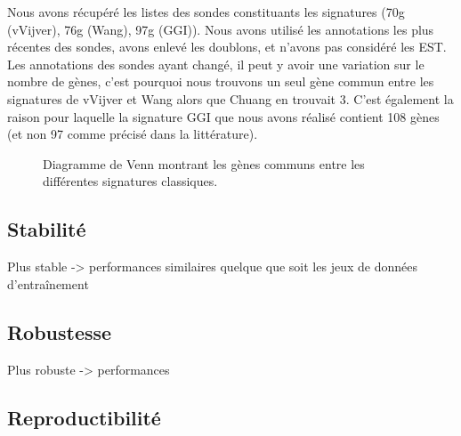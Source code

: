     Nous avons récupéré les listes des sondes constituants les signatures (70g (vVijver), 76g (Wang), 97g (GGI)). Nous avons utilisé les annotations les plus récentes des sondes, avons enlevé les doublons, et n'avons pas considéré les EST. Les annotations des sondes ayant changé, il peut y avoir une variation sur le nombre de gènes, c'est pourquoi nous trouvons un seul gène commun entre les signatures de vVijver et Wang alors que Chuang en trouvait 3. C'est également la raison pour laquelle la signature GGI que nous avons réalisé contient 108 gènes (et non 97 comme précisé dans la littérature).

    \begin{figure}
      \begin{center}
      \end{center}
      \caption{Diagramme de Venn montrant les gènes communs entre les différentes signatures classiques.}
    \end{figure}

    \subsection{\textcolor{myblue}{Stabilité}}
      Plus stable  -> performances similaires quelque que soit les jeux de données d'entraînement
    \subsection{\textcolor{myblue}{Robustesse}}
      Plus robuste -> performances 
    \subsection{\textcolor{myblue}{Reproductibilité}}

